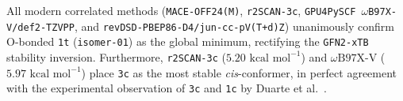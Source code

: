 \documentclass[journal=jpclcd,manuscript=article]{achemso}
\begin{document}
All modern correlated methods (\texttt{MACE-OFF24(M)}, \texttt{r2SCAN-3c}, \texttt{GPU4PySCF $\omega$B97X-V/def2-TZVPP}, and \texttt{revDSD-PBEP86-D4/jun-cc-pV(T+d)Z}) unanimously confirm O-bonded \texttt{1t} (\texttt{isomer-01}) as the global minimum, rectifying the \texttt{GFN2-xTB} stability inversion. Furthermore, \texttt{r2SCAN-3c} ($5.20\text{ kcal mol}^{-1}$) and $\omega\text{B97X-V}$ ($5.97\text{ kcal mol}^{-1}$) place \texttt{3c} as the most stable \textit{cis}-conformer, in perfect agreement with the experimental observation of \texttt{3c} and \texttt{1c} by Duarte et al.\ \cite{Duarte2017}.


\end{document}

